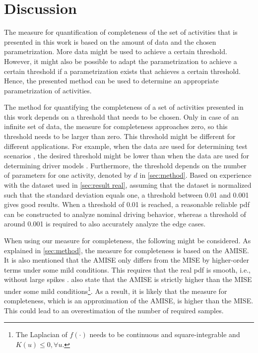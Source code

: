 \section{Discussion}
\label{sec:discussion}

The measure for quantification of completeness of the set of activities that is presented in this work is based on the amount of data and the chosen parametrization. More data might be used to achieve a certain threshold. However, it might also be possible to adapt the parametrization to achieve a certain threshold if a parametrization exists that achieves a certain threshold. Hence, the presented method can be used to determine an appropriate parametrization of activities.

The method for quantifying the completeness of a set of activities presented in this work depends on a threshold that needs to be chosen. Only in case of an infinite set of data, the measure for completeness approaches zero, so this threshold needs to be larger than zero. This threshold might be different for different applications. For example, when the data are used for determining test scenarios \cite{elrofai2018scenario, ploeg2018cetran}, the desired threshold might be lower than when the data are used for determining driver models \cite{wang2017much, sadigh2014data}. 
Furthermore, the threshold depends on the number of parameters for one activity, denoted by $d$ in \cref{sec:method}. Based on experience with the dataset used in \cref{sec:result real}, assuming that the dataset is normalized such that the standard deviation equals one, a threshold between 0.01 and 0.001 gives good results. When a threshold of 0.01 is reached, a reasonable reliable pdf can be constructed to analyze nominal driving behavior, whereas a threshold of around 0.001 is required to also accurately analyze the edge cases. 

When using our measure for completeness, the following might be considered. As explained in \cref{sec:method}, the measure for completeness is based on the AMISE. It is also mentioned that the AMISE only differs from the MISE by higher-order terms under some mild conditions. This requires that the real pdf is smooth, i.e., without large spikes \cite{marron1992exact}. \textcite{marron1992exact} also state that the AMISE is strictly higher than the MISE under some mild conditions\footnote{The Laplacian of $f(\cdot)$ needs to be continuous and square-integrable and $K(u) \leq 0, \forall u$.}. As a result, it is likely that the measure for completeness, which is an approximation of the AMISE, is higher than the MISE. This could lead to an overestimation of the number of required samples.

